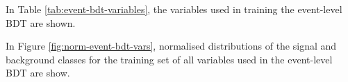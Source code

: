 In Table \ref{tab:event-bdt-variables}, the variables used in training the event-level BDT are shown.
\begin{table}[htbp!]

\caption{A list of the observables used in the event-level BDT, ordered by importance (descending, top to bottom) is shown.}
	\label{tab:event-bdt-variables}
\end{table}

In Figure \ref{fig:norm-event-bdt-vars}, normalised distributions of the signal and background classes for the training set of all variables used in the event-level BDT are show.


